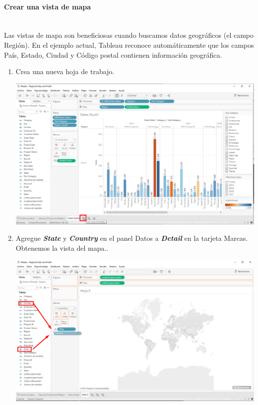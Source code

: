 \documentclass[12pt,letterpaper]{article}
\begin{document}
    \paragraph{\Large Crear una vista de mapa\\ \\}
    Las vistas de mapa son beneficiosas cuando buscamos datos geográficos (el campo Región). En el ejemplo actual, Tableau reconoce automáticamente que los campos País, Estado, Ciudad y Código postal contienen información geográfica.
    \begin{enumerate}
        \item Crea una nueva hoja de trabajo.
        \begin{center}
            \includegraphics[width=15cm]{./img/img32.png}
        \end{center}
        \item Agregue \textit{\textbf{State}} y \textit{\textbf{Country}} en el panel Datos a \textit{\textbf{Detail}} en la tarjeta Marcas. Obtenemos la vista del mapa..
        \begin{center}
            \includegraphics[width=15cm]{./img/img33.png}

\end{center}
\end{enumerate}
\end{document}
